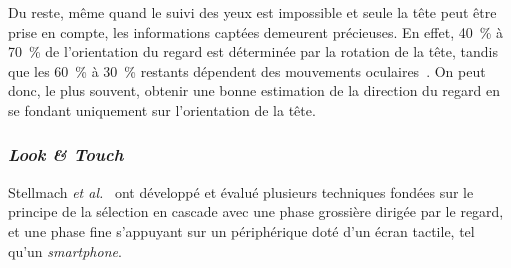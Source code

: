 	Du reste, même quand le suivi des yeux est impossible et seule la tête peut être prise en compte, les informations captées demeurent précieuses. En effet, 40~\%{} à 70~\%{} de l'orientation du regard est déterminée par la rotation de la tête, tandis que les 60~\%{} à 30~\%{} restants dépendent des mouvements oculaires~\cite{gauthier1991short}. On peut donc, le plus souvent, obtenir une bonne estimation de la direction du regard en se fondant uniquement sur l'orientation de la tête.
	
	\subsubsection{\emph{Look \&{} Touch}}
	Stellmach \emph{et al.}~\cite{stellmach2012look} ont développé et évalué plusieurs techniques fondées sur le principe de la sélection en cascade avec une phase grossière dirigée par le regard, et une phase fine s'appuyant sur un périphérique doté d'un écran tactile, tel qu'un \emph{smartphone}.
	

